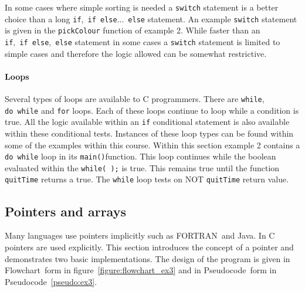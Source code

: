 \documentclass[11pt]{scrartcl}
\def\main{\texttt{main()}}
\def\psc{Pseudocode}
\def\flo{Flowchart}
\def\fortran{FORTRAN}
\begin{document}
In some cases where simple sorting is needed a \texttt{switch}
statement is a better choice than a long
\texttt{if},~\texttt{if~else}...~\texttt{else} statement.  An example
\texttt{switch} statement is given in the \texttt{pickColour} function
of example 2.  While faster than an
\texttt{if},~\texttt{if~else},~\texttt{else} statement in some cases a
\texttt{switch} statement is limited to simple cases and therefore the
logic allowed can be somewhat restrictive.

\paragraph{Loops}
Several types of loops are available to C programmers.  There are
\texttt{while}, \texttt{do~while} and \texttt{for} loops.  Each of
these loops continue to loop while a condition is true.  All the logic
available within an \texttt{if} conditional statement is also
available within these conditional tests.  Instances of these loop
types can be found within some of the examples within this course.
Within this section example 2 contains a \texttt{do~while} loop in its
\main function.  This loop continues while
the boolean evaluated within the \texttt{while(~);} is true.  This
remains true until the function \texttt{quitTime} returns a true.  The
\texttt{while} loop tests on NOT \texttt{quitTime} return value.

\subsection{Pointers and arrays \label{section:pointersarrays}}

Many languages use pointers implicitly such as \fortran\ and Java.  In
C pointers are used explicitly.  This section introduces the concept
of a pointer and demonstrates two basic implementations.  The design
of the program is given in \flo\ form in
figure~\ref{figure:flowchart_ex3} and in \psc\ form in
\psc~\ref{pseudo:ex3}.
\end{document}
